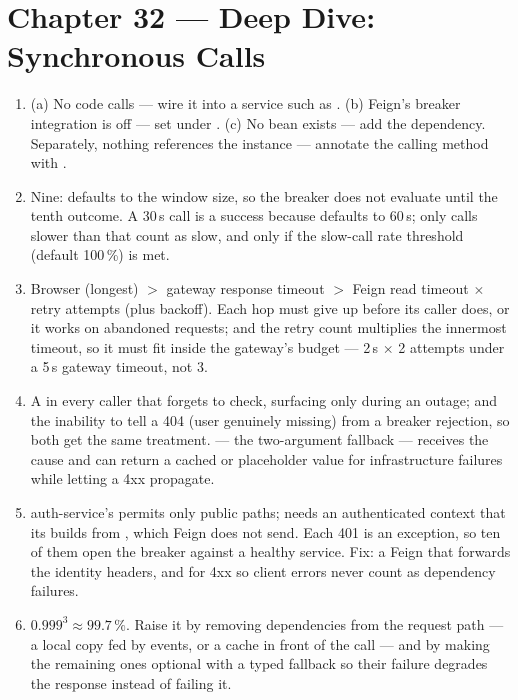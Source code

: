 \section*{Chapter 32 --- Deep Dive: Synchronous Calls}
\begin{enumerate}
  \item (a) No code calls  --- wire it into a
  service such as . (b) Feign's breaker
  integration is off --- set  under
  .
  (c) No  bean exists --- add the
   dependency.
  Separately, nothing references the  instance ---
  annotate the calling method with .
  \item Nine:  defaults to the window
  size, so the breaker does not evaluate until the tenth outcome. A
  30\,s call is a success because 
  defaults to 60\,s; only calls slower than that count as slow, and
  only if the slow-call rate threshold (default 100\,\%) is met.
  \item Browser (longest) $>$ gateway response timeout $>$ Feign read
  timeout $\times$ retry attempts (plus backoff). Each hop must give up
  before its caller does, or it works on abandoned requests; and the
  retry count multiplies the innermost timeout, so it must fit inside
  the gateway's budget --- 2\,s $\times$ 2 attempts under a 5\,s
  gateway timeout, not 3.
  \item A  in every caller that forgets to
  check, surfacing only during an outage; and the inability to tell a
  404 (user genuinely missing) from a breaker rejection, so both get
  the same treatment.  ---
  the two-argument fallback --- receives the cause and can return a
  cached or placeholder value for infrastructure failures while letting
  a 4xx propagate.
  \item auth-service's  permits only public paths;
   needs an authenticated context that its
   builds from , which
  Feign does not send. Each 401 is an exception, so ten of them open
  the breaker against a healthy service. Fix: a Feign
   that forwards the identity headers, and
   for 4xx so client errors never count as
  dependency failures.
  \item $0.999^3 \approx 99.7\,\%$. Raise it by removing dependencies
  from the request path --- a local copy fed by events, or a cache in
  front of the call --- and by making the remaining ones optional with
  a typed fallback so their failure degrades the response instead of
  failing it.
\end{enumerate}

